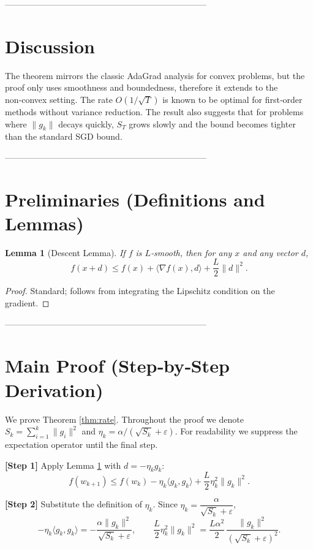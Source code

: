 \documentclass[11pt]{article}
\newtheorem{lemma}{Lemma}
\begin{document}
-----------------------------------------------------------------------

\section*{Discussion}
The theorem mirrors the classic AdaGrad analysis for convex problems,
but the proof only uses smoothness and boundedness, therefore it extends
to the non‑convex setting. The rate $O(1/\sqrt{T})$ is known to be optimal for
first‑order methods without variance reduction. The result also suggests
that for problems where $\|g_{k}\|$ decays quickly, $S_{T}$ grows slowly and
the bound becomes tighter than the standard SGD bound.

-----------------------------------------------------------------------

\section*{Preliminaries (Definitions and Lemmas)}
\begin{lemma}[Descent Lemma]\label{lem:descent}
If $f$ is $L$‑smooth, then for any $x$ and any vector $d$,
\[
f(x+d)\le f(x)+\langle\nabla f(x),d\rangle+\frac{L}{2}\|d\|^{2}.
\]
\end{lemma}
\begin{proof}
Standard; follows from integrating the Lipschitz condition on the gradient.
\end{proof}

-----------------------------------------------------------------------

\section*{Main Proof (Step‑by‑Step Derivation)}
We prove Theorem \ref{thm:rate}. Throughout the proof we denote
$S_{k}= \sum_{i=1}^{k}\|g_{i}\|^{2}$ and $\eta_{k}= \alpha/(\sqrt{S_{k}}+\varepsilon)$.
For readability we suppress the expectation operator until the final step.

\bigskip
\noindent\textbf{[Step 1]} Apply Lemma \ref{lem:descent} with
$d=-\eta_{k}g_{k}$:
\[
f(w_{k+1})\le f(w_{k})-\eta_{k}\langle g_{k},g_{k}\rangle
            +\frac{L}{2}\eta_{k}^{2}\|g_{k}\|^{2}.
\tag{1}
\]

\noindent\textbf{[Step 2]} Substitute the definition of $\eta_{k}$.
Since $\eta_{k}= \dfrac{\alpha}{\sqrt{S_{k}}+\varepsilon}$,
\[
-\eta_{k}\langle g_{k},g_{k}\rangle
   = -\frac{\alpha\|g_{k}\|^{2}}{\sqrt{S_{k}}+\varepsilon},
\qquad
\frac{L}{2}\eta_{k}^{2}\|g_{k}\|^{2}
   = \frac{L\alpha^{2}}{2}\,
     \frac{\|g_{k}\|^{2}}{(\sqrt{S_{k}}+\varepsilon)^{2}}.
\tag{2}
\]
\end{document}
